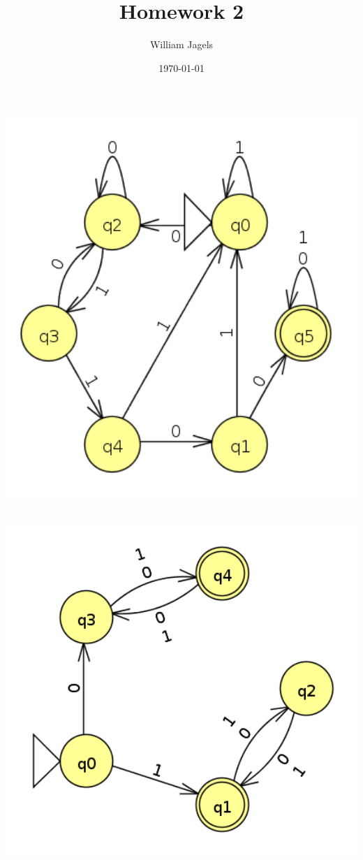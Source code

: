 \documentclass[a4paper,12pt]{article}
\title{Homework 2}
\author{William Jagels}
\date{\today}
\begin{document}
\maketitle

\section{}
\includegraphics[width=15cm]{question1}

\section{}
\includegraphics[width=15cm]{question2}
\end{document}
